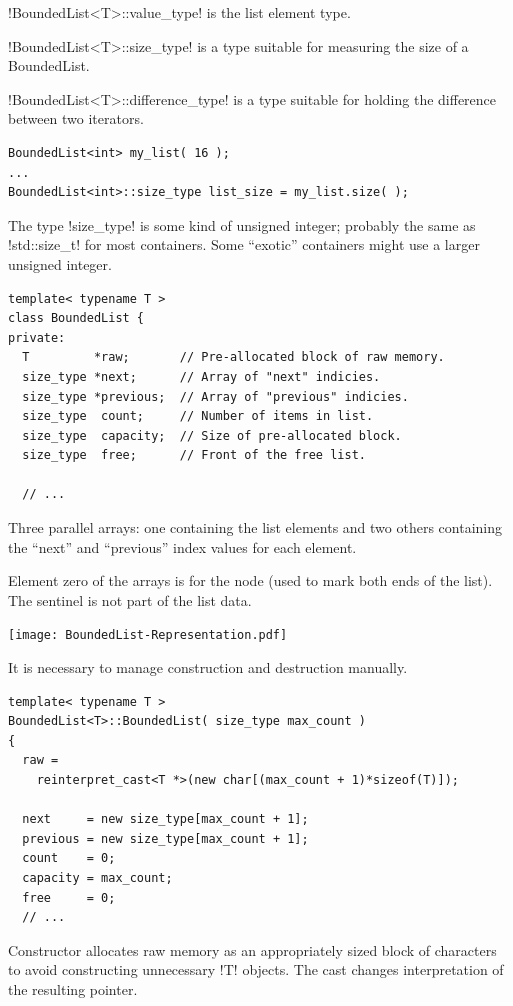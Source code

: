 \documentclass[landscape]{slides}
\begin{document}

\begin{citemize}
\item !BoundedList<T>::value_type! is the list element type.
\item !BoundedList<T>::size_type! is a type suitable for measuring the size of a BoundedList.
\item !BoundedList<T>::difference_type! is a type suitable for holding the difference between
  two iterators.
\end{citemize}
{\small
\begin{lstlisting}
BoundedList<int> my_list( 16 );
...
BoundedList<int>::size_type list_size = my_list.size( );
\end{lstlisting}
}
The type !size_type! is some kind of unsigned integer; probably the same as !std::size_t! for
most containers. Some ``exotic'' containers might use a larger unsigned integer.
\stopslide

{\small
\begin{lstlisting}
template< typename T >
class BoundedList {
private:
  T         *raw;       // Pre-allocated block of raw memory.
  size_type *next;      // Array of "next" indicies.
  size_type *previous;  // Array of "previous" indicies.
  size_type  count;     // Number of items in list.
  size_type  capacity;  // Size of pre-allocated block.
  size_type  free;      // Front of the free list.

  // ...
\end{lstlisting}
}
Three parallel arrays: one containing the list elements and two others containing the ``next''
and ``previous'' index values for each element.

Element zero of the arrays is for the  node (used to mark both ends of the
list). The sentinel is not part of the list data.
\stopslide


\begin{center}
\texttt{[image: BoundedList-Representation.pdf]}
\end{center}
\stopslide


 It is
necessary to manage construction and destruction manually.
\vspace{5mm}
{\small
\begin{lstlisting}
template< typename T >
BoundedList<T>::BoundedList( size_type max_count )
{
  raw =
    reinterpret_cast<T *>(new char[(max_count + 1)*sizeof(T)]);
 
  next     = new size_type[max_count + 1];
  previous = new size_type[max_count + 1];
  count    = 0;
  capacity = max_count;
  free     = 0;
  // ...
\end{lstlisting}
}
Constructor allocates raw memory as an appropriately sized block of characters to avoid
constructing unnecessary !T! objects. The cast changes interpretation of the resulting pointer.
\end{document}
